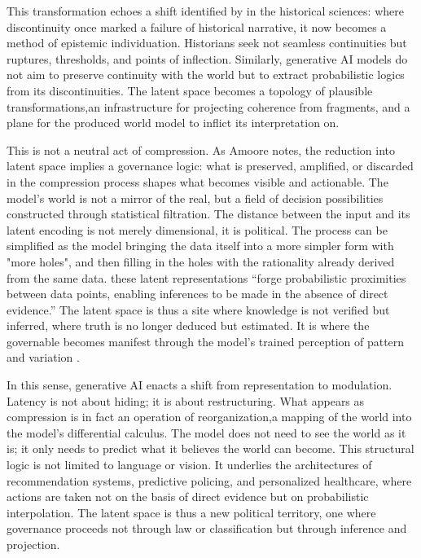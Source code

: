 This transformation echoes a shift identified by \textcite[7--9]{foucault2012a} in the historical sciences: where discontinuity once marked a failure of historical narrative, it now becomes a method of epistemic individuation. Historians seek not seamless continuities but ruptures, thresholds, and points of inflection. Similarly, generative AI models do not aim to preserve continuity with the world but to extract probabilistic logics from its discontinuities. The latent space becomes a topology of plausible transformations,an infrastructure for projecting coherence from fragments, and a plane for the produced world model to inflict its interpretation on.

This is not a neutral act of compression. As Amoore notes, the reduction into latent space implies a governance logic: what is preserved, amplified, or discarded in the compression process shapes what becomes visible and actionable. The model’s world is not a mirror of the real, but a field of decision possibilities constructed through statistical filtration. The distance between the input and its latent encoding is not merely dimensional, it is political. The process can be simplified as the model bringing the data itself into a more simpler form with "more holes", and then filling in the holes with the rationality already derived from the same data. these latent representations “forge probabilistic proximities between data points, enabling inferences to be made in the absence of direct evidence.” The latent space is thus a site where knowledge is not verified but inferred, where truth is no longer deduced but estimated. It is where the governable becomes manifest through the model’s trained perception of pattern and variation \parencite[5]{amoore2024}.

In this sense, generative AI enacts a shift from representation to modulation. Latency is not about hiding; it is about restructuring. What appears as compression is in fact an operation of reorganization,a mapping of the world into the model’s differential calculus. The model does not need to see the world as it is; it only needs to predict what it believes the world can become. This structural logic is not limited to language or vision. It underlies the architectures of recommendation systems, predictive policing, and personalized healthcare, where actions are taken not on the basis of direct evidence but on probabilistic interpolation. The latent space is thus a new political territory, one where governance proceeds not through law or classification but through inference and projection.

